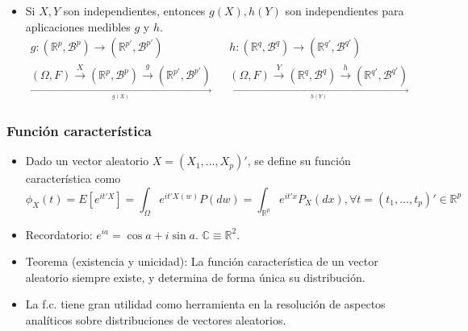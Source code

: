 \documentclass[11pt,a4paper]{article}
\begin{document}
\begin{itemize}
\item Si $X, Y$ son independientes, entonces $g(X), h(Y)$ son independientes para aplicaciones medibles $g$ y $h$.
$$\begin{aligned}
g:(\mathbb{R}^{p}, \mathcal{B}^{p}) \to (\mathbb{R}^{p'}, \mathcal{B}^{p'}) & & h:(\mathbb{R}^{q}, \mathcal{B}^{q}) \to (\mathbb{R}^{q'}, \mathcal{B}^{q'}) \\
\underset{\underset{g(X)}{\longrightarrow}}{(\Omega, F) \overset{X}{\to} (\mathbb{R}^{p}, \mathcal{B}^{p}) \overset{g}{\to} (\mathbb{R}^{p'}, \mathcal{B}^{p'})} & & \underset{\underset{h(Y)}{\longrightarrow}}{(\Omega, F) \overset{Y}{\to} (\mathbb{R}^{q}, \mathcal{B}^{q}) \overset{h}{\to} (\mathbb{R}^{q'}, \mathcal{B}^{q'})}
\end{aligned}$$
\end{itemize}

\subsubsection{Función característica}
\begin{itemize}
\item Dado un vector aleatorio $X = (X_{1}, \dots, X_{p})'$, se define su función característica como
$$\phi_{X}(t) = E[e^{it'X}] = \int_{\Omega} e^{it'X(w)}P(dw) = \int_{\mathbb{R}^{p}} e^{it'x}P_{X}(dx), \forall t = (t_{1}, \dots, t_{p})' \in \mathbb{R}^{p}$$

\item Recordatorio: $e^{ia} = \cos a + i \sin a$. \hspace{2cm} $\mathbb{C} \equiv \mathbb{R}^{2}$.

\item Teorema (existencia y unicidad): La función característica de un vector aleatorio siempre existe, y determina de forma única su distribución.

\item La f.c. tiene gran utilidad como herramienta en la resolución de aspectos analíticos sobre distribuciones de vectores aleatorios.
\end{itemize}
\end{document}
